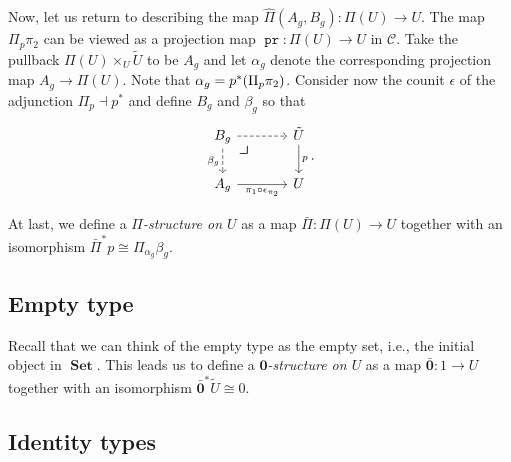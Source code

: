 \documentclass[10pt,letterpaper,cm]{nupset}
\theoremstyle{definition}
\theoremstyle{theorem}
\theoremstyle{remark}
\newcommand{\0}{\mathbf{0}}
\newcommand{\1}{\mathbf{1}}
\newcommand{\2}{\mathbf{2}}
\DeclareMathOperator{\pr}{\mathtt{pr}}
\DeclareMathOperator{\set}{\mathbf{Set}}
\renewcommand{\c}{\mathscr{C}}
\begin{document}
Now, let us return to describing the map $\hat{\Pi}(A_g, B_g) : \Pi(U) \to U$. The map $\Pi_p{\pi_2}$ can be viewed as a projection map $\pr: \Pi(U) \to U$ in $\c$. Take the pullback $\Pi(U) \times_U \tilde{U}$ to be $A_g$ and let $\alpha_g$ denote the corresponding projection map $A_g \to \Pi(U)$. Note that $\alpha_g = p^{\ast}\mleft(\Pi_p{\pi_2}\mright)$. Consider now the counit $\epsilon$ of the adjunction $\Pi_p \dashv p^{\ast}$ and define $B_g$ and $\beta_g$ so that
\[
\begin{tikzcd}[column sep=large]
B_g \arrow[r, dashed] \arrow[d, "\beta_g"', dashed]  \arrow[dr, phantom, "\scalebox{1.5}{\color{black}$\lrcorner$}", very near start] & \tilde{U} \arrow[d, "p"] \\
A_g \arrow[r, "\pi_1 \circ \epsilon_{\pi_2}"']          & U                       
\end{tikzcd}
.\]


\smallskip

At last, we define a \textit{$\Pi$-structure on $U$} as a map $\bar{\Pi} : \Pi(U) \to U $ together with an isomorphism $\bar{\Pi}^{\ast}{p}\cong \Pi_{\alpha_g}\beta_g$.\label{depprods}

\subsection*{Empty type}

Recall that we can think of the empty type as the empty set, i.e., the initial object in $\set$. This leads us to define a \textit{$\0$-structure on $U$} as a map $\bar{\0}: 1 \to U$ together with an isomorphism $\bar{\0}^{\ast}{\tilde{U}} \cong 0$.

\subsection*{Identity types}
\end{document}
